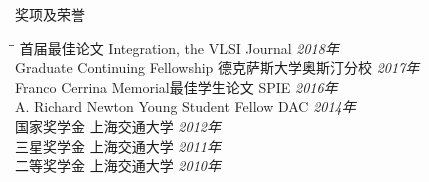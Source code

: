 
\begin{rSection}{奖项及荣誉}
\begin{tabbing}
\hspace{3.3in}\= \hspace{3.1in}\= \kill
首届最佳论文 \> Integration, the VLSI Journal \> {\em 2018年 } \\
Graduate Continuing Fellowship \> 德克萨斯大学奥斯汀分校 \> {\em 2017年 } \\
Franco Cerrina Memorial最佳学生论文 \> SPIE \> {\em 2016年 } \\
A. Richard Newton Young Student Fellow \> DAC \> {\em 2014年 } \\
国家奖学金 \> 上海交通大学 \> {\em 2012年 } \\
三星奖学金 \> 上海交通大学 \> {\em 2011年 } \\
二等奖学金 \> 上海交通大学 \> {\em 2010年 }
\end{tabbing}
\end{rSection}

